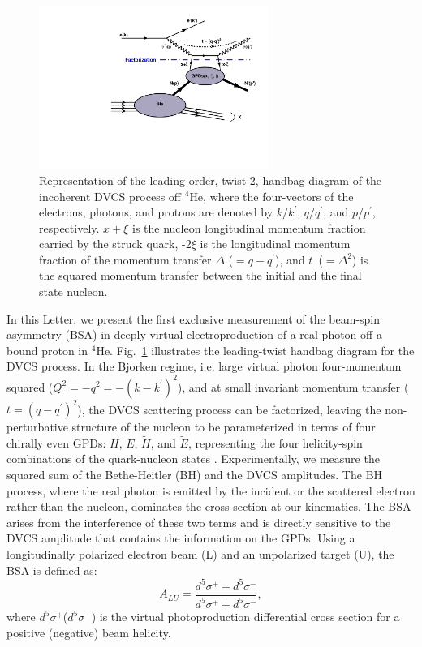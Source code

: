 \documentclass[twocolumn,nofootinbib,prl,superscriptaddress,secnumarabic,amssymb,nobibnotes,aps,floatfix]{revtex4}
\begin{document}
\begin{figure}[tb]
\includegraphics[width=7.5cm]{figs/handbag_incoherent.pdf}
\caption{Representation of the leading-order, twist-2, handbag diagram of the 
   incoherent DVCS process off $^4$He, where the four-vectors of the electrons, 
   photons, and protons are denoted by $k/k^\prime$, $q/q^\prime$, and 
   $p/p^\prime$, respectively. $x+\xi$ is the nucleon longitudinal momentum 
   fraction carried by the struck quark, -2$\xi$ is the longitudinal momentum 
   fraction of the momentum transfer $\Delta$ ($= q - q^\prime$), and 
   $t$~($=\Delta^2$) is the squared momentum transfer between the initial and
   the final state nucleon.}
\label{fig:diags}
\end{figure}

In this Letter, we present the first exclusive measurement of the beam-spin 
asymmetry (BSA) in deeply virtual electroproduction of a real photon off a 
bound proton in $^{4}$He. Fig.~\ref{fig:diags} illustrates the leading-twist 
handbag diagram for the DVCS process. In the Bjorken regime, i.e. large virtual 
photon four-momentum squared ($Q^{2}=-q^2=-(k-k^\prime)^2$), and at small 
invariant momentum transfer ($t=(q-q^\prime)^2$), the DVCS scattering process 
can be factorized, leaving the non-perturbative structure of the nucleon to be 
parameterized in terms of four chirally even GPDs: $H$, $E$, $\widetilde{H}$, 
and $\widetilde{E}$, representing the four helicity-spin combinations of the 
quark-nucleon states \cite{Freund_Collins,Ji_Osborne}. Experimentally, we 
measure the squared sum of the Bethe-Heitler (BH) and the DVCS amplitudes. The 
BH process, where the real photon is emitted by the incident or the scattered 
electron rather than the nucleon, dominates the cross section at our 
kinematics. The BSA arises from the interference of these two terms and is 
directly sensitive to the DVCS amplitude that contains the information on the 
GPDs. Using a longitudinally polarized electron beam (L) and an unpolarized 
target (U), the BSA is defined as:
\begin{equation}
  A_{LU} = \frac{d^{5}\sigma^{+} - d^{5}\sigma^{-} }
                {d^{5}\sigma^{+} + d^{5}\sigma^{-}},
    \label{BSA_equation}
  \end{equation}
where $d^{5}\sigma^{+}$($d^{5}\sigma^{-}$) is the virtual photoproduction 
differential cross section for a positive (negative) beam helicity. 
\end{document}

